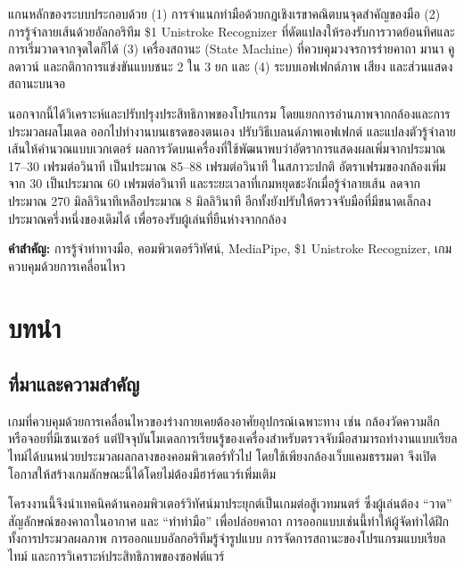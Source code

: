 \documentclass[12pt,a4paper]{report}
\begin{document}
แกนหลักของระบบประกอบด้วย (1) การจำแนกท่ามือด้วยกฎเชิงเรขาคณิตบนจุดสำคัญของมือ
(2) การรู้จำลายเส้นด้วยอัลกอริทึม \$1 Unistroke Recognizer ที่ดัดแปลงให้รองรับการวาดย้อนทิศและการเริ่มวาดจากจุดใดก็ได้
(3) เครื่องสถานะ (State Machine) ที่ควบคุมวงจรการร่ายคาถา มานา คูลดาวน์ และกติกาการแข่งขันแบบชนะ 2 ใน 3 ยก
และ (4) ระบบเอฟเฟกต์ภาพ เสียง และส่วนแสดงสถานะบนจอ

นอกจากนี้ได้วิเคราะห์และปรับปรุงประสิทธิภาพของโปรแกรม โดยแยกการอ่านภาพจากกล้องและการประมวลผลโมเดล
ออกไปทำงานบนเธรดของตนเอง ปรับวิธีเบลนด์ภาพเอฟเฟกต์ และแปลงตัวรู้จำลายเส้นให้คำนวณแบบเวกเตอร์
ผลการวัดบนเครื่องที่ใช้พัฒนาพบว่าอัตราการแสดงผลเพิ่มจากประมาณ 17--30 เฟรมต่อวินาที เป็นประมาณ 85--88 เฟรมต่อวินาที
ในสภาวะปกติ อัตราเฟรมของกล้องเพิ่มจาก 30 เป็นประมาณ 60 เฟรมต่อวินาที และระยะเวลาที่เกมหยุดชะงักเมื่อรู้จำลายเส้น
ลดจากประมาณ 270 มิลลิวินาทีเหลือประมาณ 8 มิลลิวินาที อีกทั้งยังปรับให้ตรวจจับมือที่มีขนาดเล็กลงประมาณครึ่งหนึ่งของเดิมได้
เพื่อรองรับผู้เล่นที่ยืนห่างจากกล้อง

\vspace{0.4cm}
\noindent\textbf{คำสำคัญ:} การรู้จำท่าทางมือ, คอมพิวเตอร์วิทัศน์, MediaPipe, \$1 Unistroke Recognizer, เกมควบคุมด้วยการเคลื่อนไหว

\tableofcontents
\listoffigures
\listoftables

\clearpage
{}

\chapter{บทนำ}

\section{ที่มาและความสำคัญ}
เกมที่ควบคุมด้วยการเคลื่อนไหวของร่างกายเคยต้องอาศัยอุปกรณ์เฉพาะทาง เช่น กล้องวัดความลึกหรือจอยที่มีเซนเซอร์
แต่ปัจจุบันโมเดลการเรียนรู้ของเครื่องสำหรับตรวจจับมือสามารถทำงานแบบเรียลไทม์ได้บนหน่วยประมวลผลกลางของคอมพิวเตอร์ทั่วไป
โดยใช้เพียงกล้องเว็บแคมธรรมดา จึงเปิดโอกาสให้สร้างเกมลักษณะนี้ได้โดยไม่ต้องมีฮาร์ดแวร์เพิ่มเติม

โครงงานนี้จึงนำเทคนิคด้านคอมพิวเตอร์วิทัศน์มาประยุกต์เป็นเกมต่อสู้เวทมนตร์ ซึ่งผู้เล่นต้อง ``วาด'' สัญลักษณ์ของคาถาในอากาศ
และ ``ทำท่ามือ'' เพื่อปล่อยคาถา การออกแบบเช่นนี้ทำให้ผู้จัดทำได้ฝึกทั้งการประมวลผลภาพ การออกแบบอัลกอริทึมรู้จำรูปแบบ
การจัดการสถานะของโปรแกรมแบบเรียลไทม์ และการวิเคราะห์ประสิทธิภาพของซอฟต์แวร์
\end{document}
